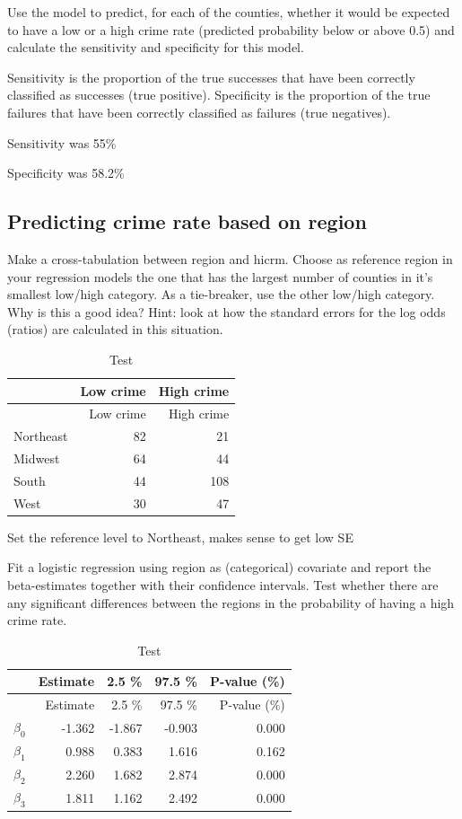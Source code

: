 \documentclass[a4paper]{article}
\begin{document}
Use the model to predict, for each of the counties, whether it would be
expected to have a low or a high crime rate (predicted probability below
or above 0.5) and calculate the sensitivity and specificity for this
model.

Sensitivity is the proportion of the true successes that have been
correctly classified as successes (true positive). Specificity is the
proportion of the true failures that have been correctly classified as
failures (true negatives).

Sensitivity was 55\%

Specificity was 58.2\%

\hypertarget{predicting-crime-rate-based-on-region}{%
\subsection{Predicting crime rate based on
region}\label{predicting-crime-rate-based-on-region}}

Make a cross-tabulation between region and hicrm. Choose as reference
region in your regression models the one that has the largest number of
counties in it's smallest low/high category. As a tie-breaker, use the
other low/high category. Why is this a good idea? Hint: look at how the
standard errors for the log odds (ratios) are calculated in this
situation.

\begin{longtable}[]{@{}lrr@{}}
\caption{Test}\tabularnewline
\toprule
& Low crime & High crime\tabularnewline
\midrule
\endfirsthead
\toprule
& Low crime & High crime\tabularnewline
\midrule
\endhead
Northeast & 82 & 21\tabularnewline
Midwest & 64 & 44\tabularnewline
South & 44 & 108\tabularnewline
West & 30 & 47\tabularnewline
\bottomrule
\end{longtable}

Set the reference level to Northeast, makes sense to get low SE

Fit a logistic regression using region as (categorical) covariate and
report the beta-estimates together with their confidence intervals. Test
whether there are any significant differences between the regions in the
probability of having a high crime rate.

\begin{longtable}[]{@{}lrrrr@{}}
\caption{Test}\tabularnewline
\toprule
& Estimate & 2.5 \% & 97.5 \% & P-value (\%)\tabularnewline
\midrule
\endfirsthead
\toprule
& Estimate & 2.5 \% & 97.5 \% & P-value (\%)\tabularnewline
\midrule
\endhead
\(\beta_0\) & -1.362 & -1.867 & -0.903 & 0.000\tabularnewline
\(\beta_1\) & 0.988 & 0.383 & 1.616 & 0.162\tabularnewline
\(\beta_2\) & 2.260 & 1.682 & 2.874 & 0.000\tabularnewline
\(\beta_3\) & 1.811 & 1.162 & 2.492 & 0.000\tabularnewline
\bottomrule
\end{longtable}
\end{document}
